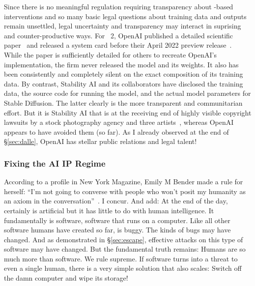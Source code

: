 Since there is no meaningful regulation requiring transparency about -based
interventions and so many basic legal questions about training data and 
outputs remain unsettled, legal uncertainty and transparency may interact in
suprising and counter-productive ways. For \DALLE~2, OpenAI published a detailed
scientific paper~\cite{RameshDhariwalea2022} and released a system card before
their April 2022 preview release~\cite{MishkinAhmad2022}. While the paper is
sufficiently detailed for others to recreate OpenAI's implementation, the firm
never released the model and its weights. It also has been consistently and
completely silent on the exact composition of its training data. By contrast,
Stability AI and its collaborators have disclosed the training data, the source
code for running the model, and the actual model parameters for Stable
Diffusion. The latter clearly is the more transparent and communitarian effort.
But it is Stability AI that is at the receiving end of highly visible copyright
lawsuits by a stock photography agency and three
artists~\cite{Butterick2023,Setty2023}, whereas OpenAI appears to have avoided
them (so far). As I already observed at the end of \S\ref{sec:dalle}, OpenAI has
stellar public relations and legal talent!


\subsubsection{Fixing the AI IP Regime}

According to a profile in New York Magazine, Emily M Bender made a rule for
herself: ``I'm not going to converse with people who won't posit my humanity as
an axiom in the conversation''~\cite{Weil2023}. I concur. And add: At the end of
the day,  certainly is artificial but it has little to do with human
intelligence. It fundamentally is software, software that runs on a computer.
Like all other software humans have created so far,  is buggy. The kinds of
bugs may have changed. And as demonstrated in \S\ref{sec:escape}, effective
attacks on this type of software may have changed. But the fundamental truth
remains: Humans are so much more than software. We rule supreme. If software
turns into a threat to even a single human, there is a very simple solution that
also scales: Switch off the damn computer and wipe its storage!

